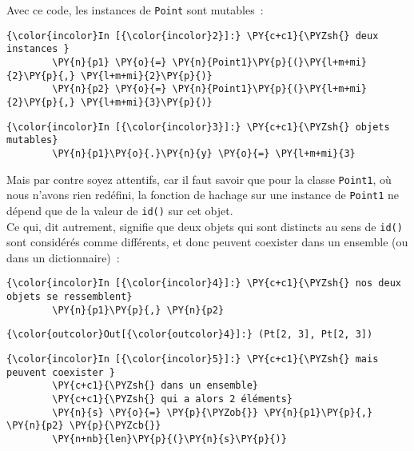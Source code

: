     Avec ce code, les instances de \texttt{Point} sont mutables~:

    \begin{Verbatim}[commandchars=\\\{\}]
{\color{incolor}In [{\color{incolor}2}]:} \PY{c+c1}{\PYZsh{} deux instances }
        \PY{n}{p1} \PY{o}{=} \PY{n}{Point1}\PY{p}{(}\PY{l+m+mi}{2}\PY{p}{,} \PY{l+m+mi}{2}\PY{p}{)}
        \PY{n}{p2} \PY{o}{=} \PY{n}{Point1}\PY{p}{(}\PY{l+m+mi}{2}\PY{p}{,} \PY{l+m+mi}{3}\PY{p}{)}
\end{Verbatim}


    \begin{Verbatim}[commandchars=\\\{\}]
{\color{incolor}In [{\color{incolor}3}]:} \PY{c+c1}{\PYZsh{} objets mutables}
        \PY{n}{p1}\PY{o}{.}\PY{n}{y} \PY{o}{=} \PY{l+m+mi}{3}
\end{Verbatim}


    Mais par contre soyez attentifs, car il faut savoir que pour la classe
\texttt{Point1}, où nous n'avons rien redéfini, la fonction de hachage
sur une instance de \texttt{Point1} ne dépend que de la valeur de
\texttt{id()} sur cet objet.\\

Ce qui, dit autrement, signifie que deux objets qui sont distincts au
sens de \texttt{id()} sont considérés comme différents, et donc peuvent
coexister dans un ensemble (ou dans un dictionnaire)~:

    \begin{Verbatim}[commandchars=\\\{\}]
{\color{incolor}In [{\color{incolor}4}]:} \PY{c+c1}{\PYZsh{} nos deux objets se ressemblent}
        \PY{n}{p1}\PY{p}{,} \PY{n}{p2}
\end{Verbatim}


\begin{Verbatim}[commandchars=\\\{\}]
{\color{outcolor}Out[{\color{outcolor}4}]:} (Pt[2, 3], Pt[2, 3])
\end{Verbatim}
            
    \begin{Verbatim}[commandchars=\\\{\}]
{\color{incolor}In [{\color{incolor}5}]:} \PY{c+c1}{\PYZsh{} mais peuvent coexister }
        \PY{c+c1}{\PYZsh{} dans un ensemble}
        \PY{c+c1}{\PYZsh{} qui a alors 2 éléments}
        \PY{n}{s} \PY{o}{=} \PY{p}{\PYZob{}} \PY{n}{p1}\PY{p}{,} \PY{n}{p2} \PY{p}{\PYZcb{}}
        \PY{n+nb}{len}\PY{p}{(}\PY{n}{s}\PY{p}{)}
\end{Verbatim}


